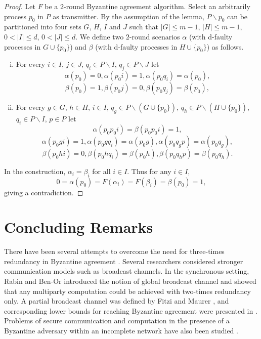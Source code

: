 \documentclass[11pt,conference,compsoc,onecolumn,romanappendices]{IEEEtran}
\newenvironment{enumerateroman}{\begin{enumerate}[i.] }{\end{enumerate}}
\begin{document}
\begin{proof}
  Let $F$ be a $2$-round Byzantine agreement algorithm. Select an arbitrarily
  process $p_0$ in $P$ as transmitter. By the assumption of the lemma, $P \backslash
  p_0$ can be partitioned into four sets $G$, $H$, $I$ and $J$ such
  that $| G | \leqslant m - 1$, $| H | \leqslant m - 1$, $0 < | I | \leqslant d$,
  $0 < | J | \leqslant d$.
  We define two $2$-round scenarios $\alpha$ (with d-faulty processes in $G \cup \{ p_0 \}$) and $\beta$ (with 
  d-faulty processes in $H \cup \{ p_0 \}$)
  as follows.
  \begin{enumerateroman}
    \item For every $i \in I$, $j \in J$, $q_i \in P \backslash I$, $q_j \in P \backslash J$ let
    \[ \alpha (p_0) = 0, \alpha (p_0 i) = 1, \alpha (p_0 q_i) = \alpha (p_0),
    \]
    \[ \beta (p_0) = 1, \beta (p_0 j) = 0, \beta (p_0 q_j) = \beta (p_0), \]
    \item For every $g \in G $, $h \in H $, $i \in I$, $q_g
    \in P \backslash (G \cup \{ p_0 \})$, $q_h \in P \backslash (H \cup \{ p_0 \})$, $q_i \in P
    \backslash I$, $p \in P$ let
  \[ \alpha (p_0 p_0 i) = \beta (p_0 p_0 i) = 1, \]
  \[ \alpha (p_0 g i) = 1, \alpha (p_0 g q_i) = \alpha (p_0 g), \alpha (p_0
     q_g p) = \alpha (p_0 q_g), \]
  \[ \beta (p_0 h i) = 0, \beta (p_0 h q_i) = \beta (p_0 h), \beta (p_0 q_h p)
     = \beta (p_0 q_h) . \]
  \end{enumerateroman}
  In the construction, $\alpha_i = \beta_i$ for all $i \in I$. Thus for any $i \in I$,
  \[ 0 = \alpha (p_0) = F (\alpha_i) = F (\beta_i) = \beta (p_0) = 1, \]
  giving a contradiction.
\end{proof}




\section{Concluding Remarks}\label{sec-rel}


There have been several attempts  to overcome the need for three-times redundancy 
in Byzantine agreement
{\cite{rabin1989verifiable,fitzi2000partial,ravikant2004byzantine,considine2005byzantine,jaffe2012price}}.
Several researchers considered stronger communication models such as
broadcast channels. In the synchronous setting, Rabin and Ben-Or
{\cite{rabin1989verifiable}} introduced the notion of global broadcast
channel and showed that any multiparty computation could be achieved with
two-times redundancy only. A partial broadcast channel was defined by Fitzi
and Maurer {\cite{fitzi2000partial}}, and corresponding lower bounds for
reaching Byzantine agreement were presented in 
{\cite{ravikant2004byzantine,considine2005byzantine,jaffe2012price}}.
Problems of secure communication and
computation in the presence of a Byzantine adversary within an {\cite{dolev1982byzantine,franklin1998secure}} incomplete network
have also been studied {\cite{dolev1982byzantine,franklin1998secure}}.
\end{document}
